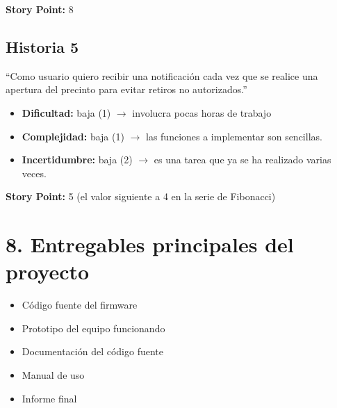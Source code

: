 \documentclass[
11pt, %
]{charter}
\begin{document}
\textbf{Story Point:} 8 

\subsection{Historia 5}
``Como usuario quiero recibir una notificación cada vez que se realice una apertura del precinto para evitar retiros no autorizados.''

\begin{itemize}
	\item \textbf{Dificultad:} baja (1) $\rightarrow$ involucra pocas horas de trabajo
	\item \textbf{Complejidad:} baja (1) $\rightarrow$ las funciones a implementar son sencillas.
	\item \textbf{Incertidumbre:} baja (2) $\rightarrow$ es una tarea que ya se ha realizado varias veces.
\end{itemize}

\textbf{Story Point:} 5 (el valor siguiente a 4 en la serie de Fibonacci) 

%
%

\section{8. Entregables principales del proyecto}
\label{sec:entregables}

\begin{itemize}
	\item Código fuente del firmware
	\item Prototipo del equipo funcionando
	\item Documentación del código fuente
	\item Manual de uso
	\item Informe final
\end{itemize}
\end{document}
